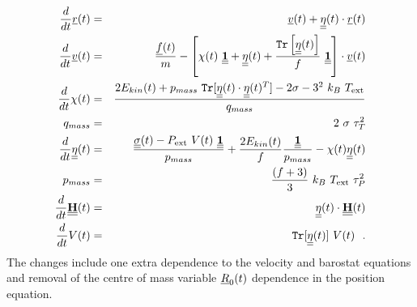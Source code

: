\begin{eqnarray}
\frac{d}{dt} \vek{r}(t) &=& \vek{v}(t) + \mat{\eta}(t) \cdot  \vek{r}(t) \nonumber \\
\frac{d}{dt} \vek{v}(t) &=& \frac{\vek{f}(t)}{m} - \left[ \chi(t)~\mat{1} +
\mat{\eta}(t) + \frac{{\tt Tr}\left[\mat{\eta}(t)\right]}{f}~\mat{1} \right] \cdot \vek{v}(t) \nonumber \\
\frac{d}{dt} \chi(t) &=& \frac{2 E_{kin}(t) + p_{mass}~{\tt Tr}[\mat{\eta}(t) \cdot
\mat{\eta}(t)^{T}] - 2 \sigma - 3^{2}~k_{B}~T_{\rm ext}}{q_{mass}} \nonumber \\
q_{mass} &=& 2~\sigma~\tau_{T}^{2} \\
\frac{d}{dt}\mat{\eta}(t) &=& \frac{\mat{\sigma}(t) -
P_{\rm ext}~V(t)~\mat{1}}{p_{mass}} + \frac{2 E_{kin}(t)}{f} \frac{\mat{1}}{p_{mass}} -
\chi(t) \mat{\eta}(t) \nonumber \\
p_{mass} &=& \frac{(f+3)}{3}~k_{B}~T_{\rm ext}~\tau_{P}^{2} \nonumber \\
\frac{d}{dt}\mat{H}(t) &=& \mat{\eta}(t) \cdot \mat{H}(t) \nonumber \\
\frac{d}{dt} V(t) &=& {\tt Tr} [\mat{\eta}(t)]~V(t)~~. \nonumber
\end{eqnarray}
The changes include one extra dependence to the velocity and
barostat equations and removal of the centre of mass
variable $\vek{R}_{0}(t)$ dependence in the position equation.

